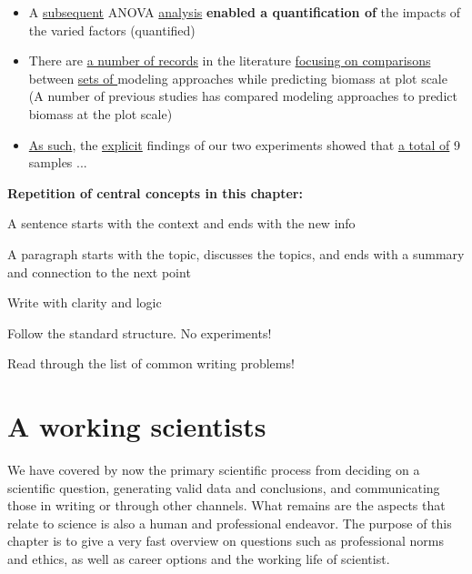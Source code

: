 \documentclass{tufte-book}
\begin{document}
\begin{itemize}

\item A \uline{subsequent} ANOVA \uline{analysis} \textbf{enabled a quantification of} the impacts of the varied factors (quantified)

\item There are \uline{a number of records} in the literature \uline{focusing on comparisons} between \uline{sets of }modeling approaches while predicting biomass at plot scale (A number of previous studies has compared modeling approaches to predict biomass at the plot scale)

\item \uline{As such}, the \uline{explicit} findings of our two experiments showed that \uline{a total of} 9 samples ... 

\end{itemize}


\vspace{1cm}
\begin{mdframed}
    
\textbf{Repetition of central concepts in this chapter:} 

\begin{itemize*}
  \item A sentence starts with the context and ends with the new info
  \item A paragraph starts with the topic, discusses the topics, and ends with a summary and connection to the next point
  \item Write with clarity and logic
  \item Follow the standard structure. No experiments!
  \item Read through the list of common writing problems!
\end{itemize*}

\end{mdframed}

\chapter{A working scientists}

We have covered by now the primary scientific process from deciding on a scientific question, generating valid data and conclusions, and communicating those in writing or through other channels. What remains are the aspects that relate to science is also a human and professional endeavor. The purpose of this chapter is to give a very fast overview on questions such as professional norms and ethics, as well as career options and the working life of scientist.
\end{document}
